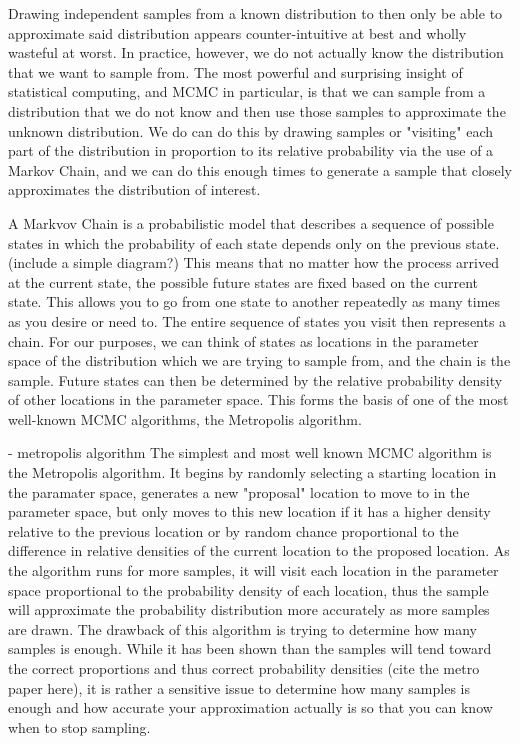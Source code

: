 Drawing independent samples from a known distribution to then only be able to approximate said distribution appears counter-intuitive at best and wholly wasteful at worst. In practice, however, we do not actually know the distribution that we want to sample from. The most powerful and surprising insight of statistical computing, and MCMC in particular, is that we can sample from a distribution that we do not know and then use those samples to approximate the unknown distribution. We do can do this by drawing samples or "visiting" each part of the distribution in proportion to its relative probability via the use of a Markov Chain, and we can do this enough times to generate a sample that closely approximates the distribution of interest.

A Markvov Chain is a probabilistic model that describes a sequence of possible states in which the probability of each state depends only on the previous state. (include a simple diagram?) This means that no matter how the process arrived at the current state, the possible future states are fixed based on the current state. This allows you to go from one state to another repeatedly as many times as you desire or need to. The entire sequence of states you visit then represents a chain. For our purposes, we can think of states as locations in the parameter space of the distribution which we are trying to sample from, and the chain is the sample. Future states can then be determined by the relative probability density of other locations in the parameter space. This forms the basis of one of the most well-known MCMC algorithms, the Metropolis algorithm.

- metropolis algorithm
The simplest and most well known MCMC algorithm is the Metropolis algorithm. It begins by randomly selecting a starting location in the paramater space, generates a new "proposal" location to move to in the parameter space, but only moves to this new location if it has a higher density relative to the previous location or by random chance proportional to the difference in relative densities of the current location to the proposed location. As the algorithm runs for more samples, it will visit each location in the parameter space proportional to the probability density of each location, thus the sample will approximate the probability distribution more accurately as more samples are drawn. The drawback of this algorithm is trying to determine how many samples is enough. While it has been shown than the samples will tend toward the correct proportions and thus correct probability densities (cite the metro paper here), it is rather a sensitive issue to determine how many samples is enough and how accurate your approximation actually is so that you can know when to stop sampling.

